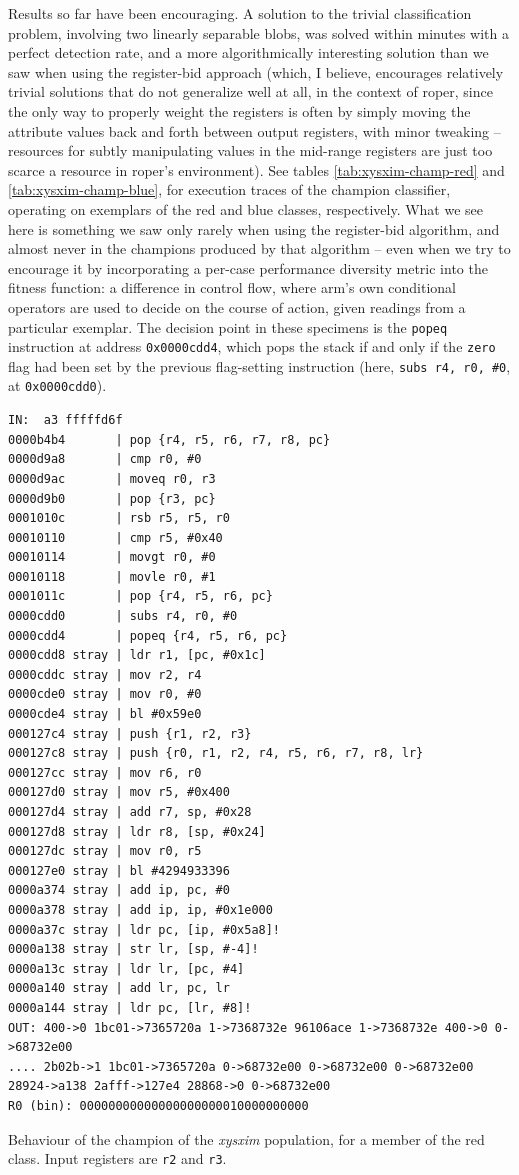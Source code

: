 \documentclass[12pt,glossary]{dalthesis}
\begin{document}
Results so far have been encouraging. A solution to the trivial classification problem, involving
two linearly separable blobs, was solved within minutes with a perfect detection rate, and a
more algorithmically interesting solution than we saw when using the register-bid approach
(which, I believe, encourages relatively trivial solutions that do not generalize well at all, in
the context of \gls{roper}, since the only way to properly weight the registers is often by simply
moving the attribute values back and forth between output registers, with minor tweaking --
resources for subtly manipulating values in the mid-range registers are just too scarce a resource
in \gls{roper}'s environment). See tables \ref{tab:xysxim-champ-red} and \ref{tab:xysxim-champ-blue},
for execution traces of the champion classifier, operating on exemplars of the red and blue classes,
respectively. What we see here is something we saw only rarely when using the register-bid algorithm,
and almost never in the champions produced by that algorithm -- even when we try to encourage it
by incorporating a per-case performance diversity metric into the fitness
function: a difference in control flow, where \gls{arm}'s own conditional
operators are used to decide on the course of action, given readings from a
particular exemplar. The decision point in these specimens is the \texttt{popeq}
instruction at address \texttt{0x0000cdd4}, which pops the stack if and only if the
\texttt{zero} flag had been set by the previous flag-setting instruction (here, \texttt{subs
 r4, r0, \#0}, at \texttt{0x0000cdd0}).

\begin{table}
\begin{lstlisting}
IN:  a3 fffffd6f
0000b4b4       | pop {r4, r5, r6, r7, r8, pc}
0000d9a8       | cmp r0, #0
0000d9ac       | moveq r0, r3
0000d9b0       | pop {r3, pc}
0001010c       | rsb r5, r5, r0
00010110       | cmp r5, #0x40
00010114       | movgt r0, #0
00010118       | movle r0, #1
0001011c       | pop {r4, r5, r6, pc}
0000cdd0       | subs r4, r0, #0
0000cdd4       | popeq {r4, r5, r6, pc}
0000cdd8 stray | ldr r1, [pc, #0x1c]
0000cddc stray | mov r2, r4
0000cde0 stray | mov r0, #0
0000cde4 stray | bl #0x59e0
000127c4 stray | push {r1, r2, r3}
000127c8 stray | push {r0, r1, r2, r4, r5, r6, r7, r8, lr}
000127cc stray | mov r6, r0
000127d0 stray | mov r5, #0x400
000127d4 stray | add r7, sp, #0x28
000127d8 stray | ldr r8, [sp, #0x24]
000127dc stray | mov r0, r5
000127e0 stray | bl #4294933396
0000a374 stray | add ip, pc, #0
0000a378 stray | add ip, ip, #0x1e000
0000a37c stray | ldr pc, [ip, #0x5a8]!
0000a138 stray | str lr, [sp, #-4]!
0000a13c stray | ldr lr, [pc, #4]
0000a140 stray | add lr, pc, lr
0000a144 stray | ldr pc, [lr, #8]!
OUT: 400->0 1bc01->7365720a 1->7368732e 96106ace 1->7368732e 400->0 0->68732e00 
.... 2b02b->1 1bc01->7365720a 0->68732e00 0->68732e00 0->68732e00 28924->a138 2afff->127e4 28868->0 0->68732e00 
R0 (bin): 00000000000000000000010000000000
\end{lstlisting}
\caption{Behaviour of the champion of the \emph{xysxim} population, for a member of the red class. Input registers are \texttt{r2} and \texttt{r3}.}
\label{tab:xysxim-champ-red}
\end{table}
\end{document}
